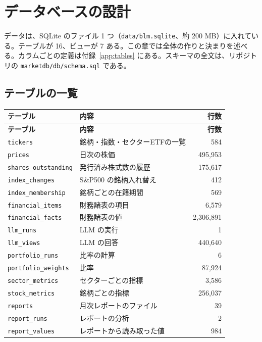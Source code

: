 \documentclass[xelatex,ja=standard,jafont=hiragino-pron,a4paper,10pt]{bxjsreport}
\newcommand{\code}[1]{\texttt{#1}}
\begin{document}
\chapter{データベースの設計}\label{ch:db}

データは、SQLite のファイル 1 つ（\code{data/blm.sqlite}、約 200 MB）に入れている。テーブルが 16、ビューが 7 ある。この章では全体の作りと決まりを述べる。カラムごとの定義は付録~\ref{app:tables} にある。スキーマの全文は、リポジトリの \code{marketdb/db/schema.sql} である。

\section{テーブルの一覧}

{\small
\begin{longtable}{p{4.20cm}p{6.20cm}r}
\toprule
\textbf{テーブル} & \textbf{内容} & \textbf{行数} \\
\midrule
\endfirsthead
\toprule
\textbf{テーブル} & \textbf{内容} & \textbf{行数} \\
\midrule
\endhead
\bottomrule
\endfoot
\texttt{tickers} & 銘柄・指数・セクターETFの一覧 & 584 \\
\texttt{prices} & 日次の株価 & 495,953 \\
\texttt{shares\_\allowbreak{}outstanding} & 発行済み株式数の履歴 & 175,617 \\
\texttt{index\_\allowbreak{}changes} & S\&P500 の銘柄入れ替え & 412 \\
\texttt{index\_\allowbreak{}membership} & 銘柄ごとの在籍期間 & 569 \\
\texttt{financial\_\allowbreak{}items} & 財務諸表の項目 & 6,579 \\
\texttt{financial\_\allowbreak{}facts} & 財務諸表の値 & 2,306,891 \\
\texttt{llm\_\allowbreak{}runs} & LLM の実行 & 1 \\
\texttt{llm\_\allowbreak{}views} & LLM の回答 & 440,640 \\
\texttt{portfolio\_\allowbreak{}runs} & 比率の計算 & 6 \\
\texttt{portfolio\_\allowbreak{}weights} & 比率 & 87,924 \\
\texttt{sector\_\allowbreak{}metrics} & セクターごとの指標 & 3,586 \\
\texttt{stock\_\allowbreak{}metrics} & 銘柄ごとの指標 & 256,037 \\
\texttt{reports} & 月次レポートのファイル & 39 \\
\texttt{report\_\allowbreak{}runs} & レポートの分析 & 2 \\
\texttt{report\_\allowbreak{}values} & レポートから読み取った値 & 984 \\
\end{longtable}
}
\end{document}
